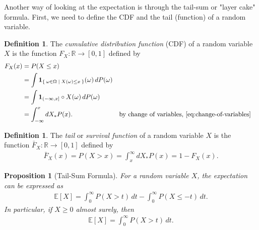 \documentclass[11pt,reqno]{amsart}
\newtheorem{proposition}[theorem]{Proposition}
\theoremstyle{definition}
\newtheorem{definition}[theorem]{Definition}
\theoremstyle{remark}
\begin{document}
Another way of looking at the expectation is through the tail-sum or "layer cake" formula. First, we need to define the CDF and the tail (function) of a random variable.

\begin{definition}
	The \emph{cumulative distribution function} (CDF) of a random variable $X$ is the function $F_X: \mathbb{R} \to [0,1]$ defined by
	\begin{align*}
		F_X(x)
		 & = P(X \leq x)                                                                                                                                           \\
		 & = \int \mathbf{1}_{\Set{\omega \in \Omega | X(\omega) \leq x}}(\omega) \, dP(\omega)                                                                    \\
		 & = \int \mathbf{1}_{(-\infty, x]} \circ X (\omega) \, dP(\omega)                                                                                         \\
		 & = \int_{-\infty}^x dX_*P(x).                                                         &  & \text{by change of variables, \eqref{eq:change-of-variables}}
	\end{align*}
\end{definition}


\begin{definition}
	The \emph{tail} or \emph{survival function} of a random variable $X$ is the function $\bar{F}_X: \mathbb{R} \to [0,1]$ defined by
	\begin{align*}
		\bar{F}_X(x) = P(X > x) = \int_x^\infty dX_*P(x) = 1 - F_X(x).
	\end{align*}
\end{definition}

\begin{proposition}[Tail-Sum Formula]
	For a random variable $X$, the expectation can be expressed as
	\begin{align*}
		\mathbb{E}[X] = \int_0^\infty P(X > t) \, dt - \int_0^\infty P(X \leq -t) \, dt.
	\end{align*}
	In particular, if $X \geq 0$ almost surely, then
	\begin{align*}
		\mathbb{E}[X] = \int_0^\infty P(X > t) \, dt.
	\end{align*}
\end{proposition}
\end{document}
